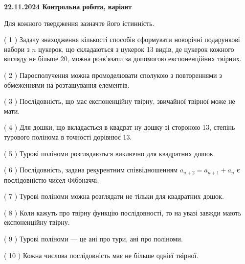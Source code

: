 \documentclass[12pt, ukrainian]{article}
\begin{document}
\vspace{4mm}
\newpage
\begin {large}

\textbf{22.11.2024 Контрольна робота, варіант  }\par


{
Для кожного твердження зазначте його істинність.\par
\vspace{2mm}
( 1 ) Задачу знаходження кількості способів сформувати новорічні подарункові набори з $n$ цукерок, що складаються з цукерок 13 видів, де цукерок кожного вигляду не більше 20, можна розв’язати за допомогою експоненційних твірних.%

( 2 ) Паросполучення можна промоделювати сполукою з повтореннями з обмеженнями на розташування елементів.%

( 3 ) Послідовність, що має експоненційну твірну, звичайної твірної може не мати.%

( 4 ) Для дошки, що вкладається в квадрат ну дошку зі стороною 13, степінь турового полінома в точності дорівнює 13.%

( 5 ) Турові поліноми розглядаються виключно для квадратних дошок.%

( 6 ) Послідовність, задана рекурентним співвідношенням $a_{n+2}=a_{n+1}+a_{n}$ є послідовністю чисел Фібоначчі.%

( 7 ) Турові поліноми можна розглядати не тільки для квадратних дошок.%

( 8 ) Коли кажуть про твірну функцію послідовності, то на увазі завжди мають експоненційну твірну.%

( 9 ) Турові поліноми --- це ані про тури, ані про поліноми.%

( 10 ) Кожна числова послідовність має не більше однієї твірної.%


\vspace{5mm}
}
\end {large}
\end{document}
